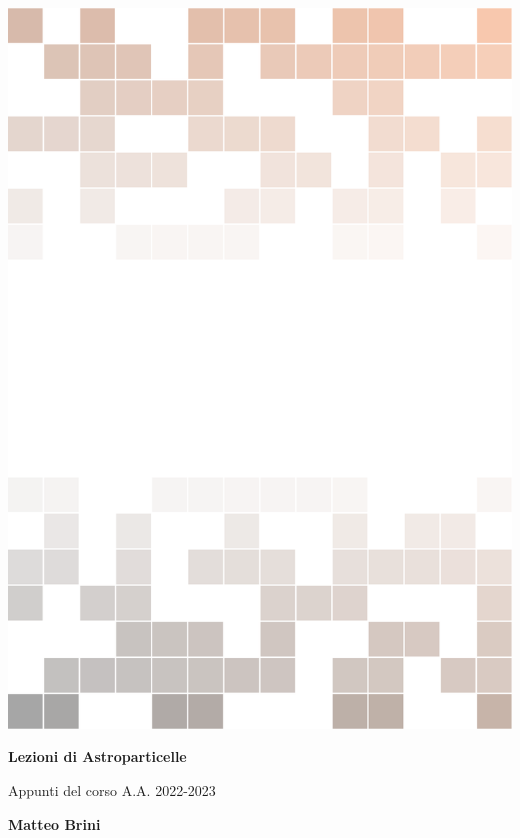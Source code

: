 \documentclass[
	11pt, %
	fleqn, %
	a4paper, %
]{LegrandOrangeBook}
\begin{document}

\titlepage %
	{\includegraphics[width=\paperwidth]{img/background.pdf}} %
	{ %
		\centering\sffamily %
		{\Huge\bfseries Lezioni di Astroparticelle\par} %
		\vspace{16pt} %
		{\LARGE Appunti del corso A.A. 2022-2023\par} %
		\vspace{24pt} %
		{\huge\bfseries Matteo Brini\par} %
	}
\end{document}
